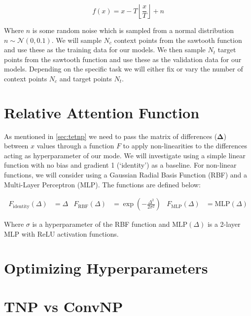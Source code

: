 \documentclass[../../main.tex]{subfiles}
\begin{document}
\begin{equation}
	f(x) = x - T \left\lfloor \frac{x}{T} \right\rfloor + n
\end{equation}

Where $n$ is some random noise which is sampled from a normal distribution $n \sim \mathcal{N}(0, 0.1)$.
We will sample $N_c$ context points from the sawtooth function and use these as the training data for our models. We then sample $N_t$ target points from the sawtooth function and use these as the validation data for our models. Depending on the specific task we will either fix or vary the number of context points $N_c$ and target points $N_t$.


\section{Relative Attention Function}

As mentioned in \autoref{sec:tetnp} we need to pass the matrix of differences ($\bm{\Delta}$) between $x$ values through a function $F$ to apply non-linearities to the differences acting as hyperparameter of our mode. We will investigate using a simple linear function with no bias and gradient 1 (`identity') as a baseline. For non-linear functions, we will consider using a Gaussian Radial Basis Function (RBF) and a Multi-Layer Perceptron (MLP). The functions are defined below:

\begin{align}
	F_{\text{identity}}(\Delta) &= \Delta&
	F_{\text{RBF}}(\Delta) &= \exp\left(-\frac{\Delta^2}{2\sigma^2}\right)&
	F_{\text{MLP}}(\Delta) &= \text{MLP}(\Delta)
\end{align}

Where $\sigma$ is a hyperparameter of the RBF function and $\text{MLP}(\Delta)$ is a 2-layer MLP with ReLU activation functions.


\section{Optimizing Hyperparameters}




\section{TNP vs ConvNP}


\ifSubfilesClassLoaded{%
    \printbibliography{}
}{} 
\end{document}
